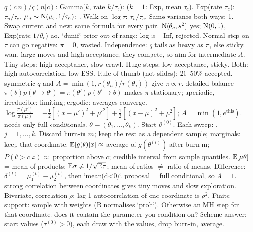 \sk{} $q(c|n)/q(n|c)$: Gamma$(k$, rate $k/\tau_c)$:  ($k=1$: Exp, mean $\tau_c$). Exp(rate $\tau_c$): $\tau_n/\tau_c$. $\mu_n\sim\mathrm{N}(\mu_c,1/\tau_n)$: . Walk on $\log\tau$: $\tau_n/\tau_c$. Same variance both ways: 1.
\sk{} Swap current and new: same formula for every pair. $\mathrm{N}(\theta_c,s^2)$ yes; $\mathrm{N}(0,1)$, Exp(rate $1/\theta_c$) no.  `dunif` prior out of range: log is $-$Inf, rejected. Normal step on $\tau$ can go negative: $\pi=0$, wasted. Independence: $q$ tails as heavy as $\pi$, else sticky.
\sk{} want large moves and high acceptance; they compete, so aim for intermediate $A$. Tiny steps: high acceptance, slow crawl. Huge steps: low acceptance, sticky. Both: high autocorrelation, low ESS. Rule of thumb (not slides): 20--50\% accepted.
\sk{} symmetric $q$ and $A=\min(1,r(\theta_n)/r(\theta_o))$ give $\pi\propto r$.
\sk{} detailed balance $\pi(\theta)p(\theta\to\theta')=\pi(\theta')p(\theta'\to\theta)$ makes $\pi$ stationary; aperiodic, irreducible: limiting; ergodic: averages converge.
\sk{} $\log\frac{\pi(\mu')}{\pi(\mu)}=-\frac12[(x-\mu')^2+\mu'^2]+\frac12[(x-\mu)^2+\mu^2]$; $A=\min(1,e^{\text{this}})$.
\bx
{} needs only full conditionals. $\theta=(\theta_1,\dots,\theta_k)$. Start $\theta^{(0)}$. Each sweep: , $j=1,\dots,k$. Discard burn-in $m$; keep the rest as a dependent sample; marginals: keep that coordinate.
\sk{} $\mathbb{E}[g(\theta)|x]\approx$ average of $g(\theta^{(t)})$ after burn-in; $P(\theta>c|x)\approx$ proportion above $c$; credible interval from sample quantiles.  $\mathbb{E}[\mu\theta]$ = mean of products; $\mathbb{E}\sigma\ne1/\sqrt{\mathbb{E}\tau}$; mean of ratios $\ne$ ratio of means. Difference: $\delta^{(t)}=\mu_1^{(t)}-\mu_2^{(t)}$, then `mean(d<0)`.
\sk{} proposal = full conditional, so $A=1$.  strong correlation between coordinates gives tiny moves and slow exploration. Bivariate, correlation $\rho$: lag-1 autocorrelation of one coordinate is $\rho^2$.
\sk{} Finite support: sample with weights (R normalises `prob`). Otherwise an MH step for that coordinate.
\sk{} does it contain the parameter you condition on? Scheme answer: start values ($\tau^{(0)}>0$), each draw with the  values, drop burn-in, average.
